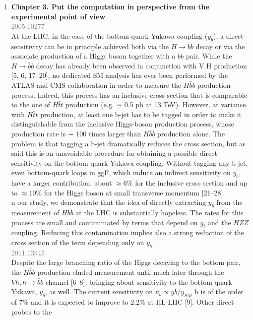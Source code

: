 \documentclass[main.tex]{subfiles}
\begin{document}
\begin{enumerate}
    \item \textbf{Chapter 3. Put the computation in perspective from the experimental point of view} \\
    \textcolor{gray}{2005.10277} 
    \\
    At the LHC, in the case of the bottom-quark Yukawa coupling ($y_b$), a direct sensitivity can
be in principle achieved both via the $H \rightarrow \bar{b}b$ decay or via the associate production of a Higgs
boson together with a $\bar{b}b$ pair. While the $H \rightarrow \bar{b}b$ decay has already been observed in conjunction
with V H production [5, 6, 17–20], no dedicated SM analysis has ever been performed by the
ATLAS and CMS collaboration in order to measure the $H\bar{b}b$ production process. Indeed, this
process has an inclusive cross section that is comparable to the one of $H \bar{t}t$ production (e.g. ∼ 0.5
pb at 13 TeV). However, at variance with $H \bar{t}t$ production, at least one b-jet has to be tagged
in order to make it distinguishable from the inclusive Higgs-boson production process, whose
production rate is ∼ 100 times larger than $H\bar{b}b$ production alone. The problem is that tagging
a b-jet dramatically reduces the cross section, but as said this is an unavoidable procedure for
obtaining a possible direct sensitivity on the bottom-quark Yukawa coupling. Without tagging
any b-jet, even bottom-quark loops in ggF, which induce an indirect sensitivity on $y_b$, have a
larger contribution: about $\approx6\%$ for the inclusive cross section and up to $\approx10\%$ for the Higgs
boson at small transverse momentum [21–28].
\\
n our study, we demonstrate that the idea of directly extracting $y_b$ from the measurement of
$H\bar{b}b$  at the LHC is substantially hopeless. The rates for this process are small and contaminated
by terms that depend on $y_t$ and the $HZZ$ coupling. Reducing this contamination implies also
a strong reduction of the cross section of the term depending only on $y_b$.
\\
\textcolor{gray}{2011.13945}
\\
Despite the large
branching ratio of the Higgs decaying to the bottom pair, the $H\bar{b}b$ production eluded measurement
until much later through the $V h, h \rightarrow \bar{b}b$ channel [6–8], bringing about sensitivity to the
bottom-quark Yukawa, $y_b$, as well. The current sensitivity on $\kappa_b \propto y{b}/y_{SM}$
b is of the order
of $7\%$ and it is expected to improve to $2.2\%$ at HL-LHC [9]. Other direct probes to the

\end{enumerate}
\end{document}
